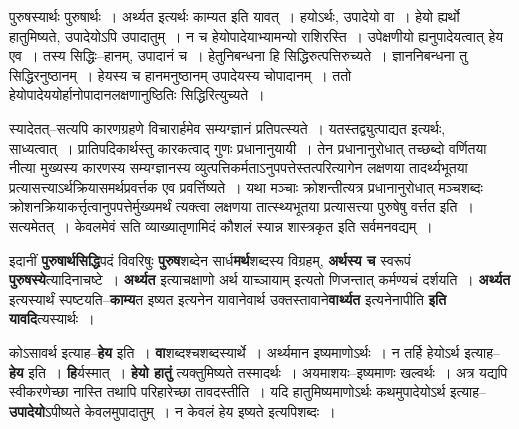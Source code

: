 \documentclass[article,12pt,a4paper]{memoir}
\begin{document}
	  \pstart पुरुषस्यार्थः पुरुषार्थः । अर्थ्यत इत्यर्थः काम्यत इति यावत् । हयोऽर्थः, उपादेयो वा । हेयो ह्यर्थो हातुमिष्यते, उपादेयोऽपि उपादातुम् । न च हेयोपादेयाभ्यामन्यो राशिरस्ति । उपेक्षणीयो ह्यनुपादेयत्वात् हेय एव । तस्य सिद्धिः--हानम्, उपादानं च । हेतुनिबन्धना हि सिद्धिरुत्पत्तिरुच्यते । ज्ञाननिबन्धना तु सिद्धिरनुष्ठानम् । हेयस्य च हानमनुष्ठानम् उपादेयस्य चोपादानम् । ततो हेयोपादेययोर्हानोपादानलक्षणानुष्ठितिः सिद्धिरित्युच्यते ।
	\pend
      
	  \endgroup
	

	  \pstart स्यादेतत्--सत्यपि कारणग्रहणे विचारार्हमेव सम्यग्ज्ञानं प्रतिपत्स्यते । यतस्तद्व्युत्पाद्यत इत्यर्थः, साध्यत्वात् । प्रातिपदिकार्थस्तु कारकत्वाद् गुणः प्रधानानुयायी । तेन प्रधानानुरोधात् तच्छब्दो वर्णितया नीत्या मुख्यस्य कारणस्य सम्यग्ज्ञानस्य व्युत्पत्तिकर्मताऽनुपपत्तेस्तत्परित्यागेन लक्षणया तादर्थ्यभूतया प्रत्यासत्त्याऽर्थक्रियासमर्थप्रवर्त्तक एव प्रवर्त्तिष्यते । यथा मञ्चाः क्रोशन्तीत्यत्र प्रधानानुरोधात् मञ्चशब्दः क्रोशनक्रियाकर्त्तृत्वानुपपत्तेर्मुख्यमर्थं त्यक्त्वा लक्षणया तात्स्थ्यभूतया प्रत्यासत्त्या पुरुषेषु वर्त्तत इति । सत्यमेतत् । केवलमेवं सति व्याख्यातृणामिदं कौशलं स्यान्न शास्त्रकृत इति सर्वमनवद्यम् ।
	\pend
      

	  \pstart इदानीं \textbf{पुरुषार्थसिद्धि}पदं विवरिषुः \textbf{पुरुष}शब्देन सार्ध\textbf{मर्थ}शब्दस्य विग्रहम्, \textbf{अर्थस्य च} स्वरूपं \textbf{पुरुषस्ये}त्यादिनाचष्टे । \textbf{अर्थ्यत} इत्याचक्षाणो अर्थ याच्ञायाम् इत्यतो णिजन्तात् कर्मण्यचं दर्शयति । \textbf{अर्थ्यत} इत्यस्यार्थं स्पष्टयति--\textbf{काम्य}त इष्यत इत्यनेन यावानेवार्थ उक्तस्तावाने\textbf{वार्थ्यत} इत्यनेनापीति \textbf{इति यावदि}त्यस्यार्थः ।
	\pend
      

	  \pstart कोऽसावर्थ इत्याह--\textbf{हेय} इति । \textbf{वा}शब्दश्चशब्दस्यार्थे । अर्थ्यमान इष्यमाणोऽर्थः । न तर्हि हेयोऽर्थ इत्याह--\textbf{हेय} इति । \textbf{हि}र्यस्मात् । \textbf{हेयो हातुं} त्यक्तुमिष्यते तस्मादर्थः । अयमाशयः--इष्यमाणः खल्वर्थः । अत्र यद्यपि स्वीकरणेच्छा नास्ति तथापि परिहारेच्छा तावदस्तीति । यदि हातुमिष्यमाणोऽर्थः कथमुपादेयोऽर्थ इत्याह--\textbf{उपादेयो}ऽपीष्यते केवलमुपादातुम् । न केवलं हेय इष्यते इत्यपिशब्दः ।
	\pend
      
\end{document}
